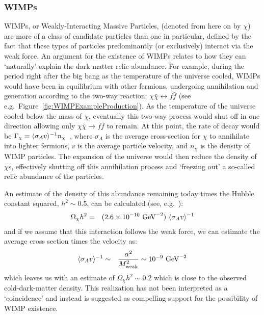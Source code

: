 			\subsubsection{WIMPs}
 WIMPs, or Weakly-Interacting Massive Particles, (denoted from here on by $\chi$) are more of a class of candidate particles than one in particular, defined by the fact that these types of particles predominantly (or exclusively) interact via the weak force.  An argument for the existence of WIMPs relates to how they can `naturally' explain the dark matter relic abundance.
  For example, during the period right after the big bang as the temperature of the universe cooled, WIMPs would have been in equilibrium with other fermions, undergoing annihilation and generation according to the two-way reaction: $\chi\bar{\chi} \leftrightarrow f\bar{f} $ (see e.g.~Figure~\ref{fig:WIMPExampleProduction}).  As the temperature of the universe cooled below the mass of $\chi$, eventually this two-way process would shut off in one direction allowing only $\chi\bar{\chi} \rightarrow f\bar{f} $ to remain.  At this point, the rate of decay would be $\Gamma_{\chi} = \langle \sigma_{A} v \rangle^{-1} n_{\chi}$~\cite{Jun96}, where $\sigma_{A}$ is the average cross-section for $\chi$ to annihilate into lighter fermions, $v$ is the average particle velocity, and $n_{\chi}$ is the density of WIMP particles.  The expansion of the universe would then reduce the density of $\chi$s, effectively shutting off this annihilation process and `freezing out' a so-called relic abundance of the particles.  

An estimate of the density of this abundance remaining today times the Hubble constant squared, $h^{2}\sim0.5$, can be calculated (see, e.g.~\cite{Jun96}):
			\begin{eqnarray}
				\Omega_{\chi} h^{2} & = & (2.6 \times 10^{-10}~\text{GeV}^{-2})~\langle \sigma_{A} v \rangle^{-1} \\
			\end{eqnarray}
and if we assume that this interaction follows the weak force, we can estimate the average cross section times the velocity as:
			\begin{eqnarray}
				\langle \sigma_{A} v \rangle^{-1} & \sim & \frac{\alpha^{2}}{M_{\text{weak}}^{2}} \sim 10^{-9}~\text{GeV}^{-2}\\			
			\end{eqnarray}
which leaves us with an estimate of 	$\Omega_{\chi} h^{2} \sim 0.2$ which is close to the observed cold-dark-matter density.  This realization has not been interpreted as a `coincidence' and instead is suggested as compelling support for the possibility of WIMP existence.  
		
